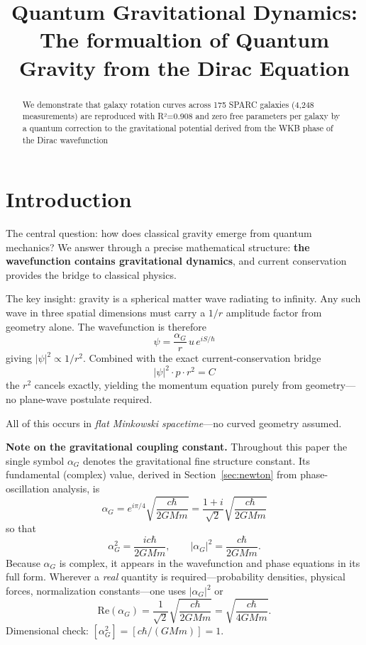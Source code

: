 \documentclass[11pt,a4paper]{article}
\title{Quantum Gravitational Dynamics:\\
	The formualtion of Quantum Gravity from the Dirac Equation}
\author{}
\date{}
\theoremstyle{definition}
\theoremstyle{remark}
\begin{document}
	\maketitle
	
	\begin{abstract}
		We demonstrate that galaxy rotation curves across 175 SPARC galaxies (4,248 measurements) are reproduced with R²=0.908 and zero free parameters per galaxy by a quantum correction to the gravitational potential derived from the WKB phase of the Dirac wavefunction
	\end{abstract}
	
	\section{Introduction}
	
	The central question: how does classical gravity emerge from quantum mechanics? We answer through a precise mathematical structure: \textbf{the wavefunction contains gravitational dynamics}, and current conservation provides the bridge to classical physics.
	
	The key insight: gravity is a spherical matter wave radiating to infinity.  Any such wave in three spatial dimensions must carry a $1/r$ amplitude factor from geometry alone.  The wavefunction is therefore
	\begin{equation}
		\psi = \frac{\alpha_G}{r}\,u\,e^{iS/\hbar}
	\end{equation}
	giving $|\psi|^2 \propto 1/r^2$.  Combined with the exact current-conservation bridge
	\begin{equation}
		|\psi|^2 \cdot p \cdot r^2 = C
	\end{equation}
	the $r^2$ cancels exactly, yielding the momentum equation purely from geometry---no plane-wave postulate required.
	
	All of this occurs in \textit{flat Minkowski spacetime}---no curved geometry assumed.
	
	\bigskip
	\noindent\textbf{Note on the gravitational coupling constant.}
	Throughout this paper the single symbol $\alpha_G$ denotes the gravitational fine structure constant.  Its fundamental (complex) value, derived in Section~\ref{sec:newton} from phase-oscillation analysis, is
	\begin{equation}
		\boxed{\alpha_G = e^{i\pi/4}\sqrt{\frac{c\hbar}{2GMm}} = \frac{1+i}{\sqrt{2}}\sqrt{\frac{c\hbar}{2GMm}}}
		\label{eq:alphaG_def}
	\end{equation}
	so that
	\begin{equation}
		\alpha_G^2 = \frac{ic\hbar}{2GMm}, \qquad |\alpha_G|^2 = \frac{c\hbar}{2GMm}.
		\label{eq:alphaG_props}
	\end{equation}
	Because $\alpha_G$ is complex, it appears in the wavefunction and phase equations in its full form.  Wherever a \emph{real} quantity is required---probability densities, physical forces, normalization constants---one uses $|\alpha_G|^2$ or
	\begin{equation}
		\mathrm{Re}(\alpha_G) = \frac{1}{\sqrt{2}}\sqrt{\frac{c\hbar}{2GMm}} = \sqrt{\frac{c\hbar}{4GMm}}.
		\label{eq:alphaG_real}
	\end{equation}
	Dimensional check: $[\alpha_G^2] = [c\hbar/(GMm)] = 1$.~\checkmark
	
\end{document}
